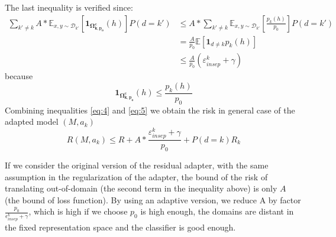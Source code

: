 \documentclass[12pt,times,a4paper,twoside]{article}
\theoremstyle{definition}
\begin{document}
The last inequality is verified since:
\begin{equation}
\begin{split}
\displaystyle{\mathop{\sum}_{k' \neq k}} A * \mathbb{E}_{x,y \sim \mathcal{D}_{k'}} [\mathbf{1}_{\mathbf{\Omega_{k,p_{0}}^{c}}} (h)]P(d=k') &\leq A * \displaystyle{\mathop{\sum}_{k' \neq k}} \mathbb{E}_{x,y \sim \mathcal{D}_{k'} } [\frac{p_k(h)}{p_0}]P(d=k') \\
		& = \frac{A}{p_0} \mathbb{E}[\mathbf{1}_{d\neq k}p_k(h)] \\
		& \leq \frac{A}{p_0} (\mathbb{\varepsilon}_{insep}^k + \gamma)
\end{split}
\end{equation}
because
$$ \mathbf{1}_{\mathbf{\Omega_{k,p_{0}}^{c}}}(h) \leq \frac{p_k(h)}{p_0} $$
Combining inequalities \ref{eq:4} and \ref{eq:5} we obtain the risk in general case of the adapted model $(M,a_k)$ $$R(M,a_k) \leq R + A * \frac{\mathbb{\varepsilon}_{insep}^k + \gamma}{p_0} + P(d=k)R_k$$

If we consider the original version of the residual adapter, with the same assumption in the regularization of the adapter, the bound of the risk of translating out-of-domain (the second term in the inequality above) is only $A$ (the bound of loss function). By using an adaptive version, we reduce A by factor $\frac{p_0}{\epsilon^k_{insep}+\gamma}$, which is high if we choose $p_0$ is high enough, the domains are distant in the fixed representation space and the classifier is good enough. 
\end{document}
